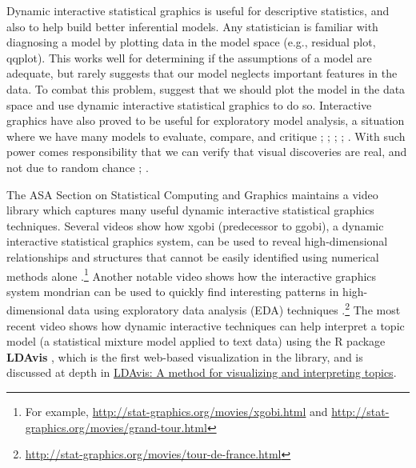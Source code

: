 \documentclass[11pt]{isuthesis}
\begin{document}
Dynamic interactive statistical graphics is useful for descriptive
statistics, and also to help build better inferential models. Any
statistician is familiar with diagnosing a model by plotting data in the
model space (e.g., residual plot, qqplot). This works well for
determining if the assumptions of a model are adequate, but rarely
suggests that our model neglects important features in the data. To
combat this problem, \citep{Wickham:2015ur} suggest that we should plot
the model in the data space and use dynamic interactive statistical
graphics to do so. Interactive graphics have also proved to be useful
for exploratory model analysis, a situation where we have many models to
evaluate, compare, and critique \citep{Unwin:2003uy};
\citep{Urbanek:2004}; \citep{Ripley:2004}; \citep{Unwin:2006};
\citep{Wickham:2007wq}. With such power comes responsibility that we can
verify that visual discoveries are real, and not due to random chance
\citep{Buja:2009hp}; \citep{Majumder:2013ie}.

The ASA Section on Statistical Computing and Graphics maintains a video
library which captures many useful dynamic interactive statistical
graphics techniques. Several videos show how xgobi (predecessor to
ggobi), a dynamic interactive statistical graphics system, can be used
to reveal high-dimensional relationships and structures that cannot be
easily identified using numerical methods alone \citep{xgobi}.\footnote{For
  example, \url{http://stat-graphics.org/movies/xgobi.html} and
  \url{http://stat-graphics.org/movies/grand-tour.html}} Another notable
video shows how the interactive graphics system mondrian can be used to
quickly find interesting patterns in high-dimensional data using
exploratory data analysis (EDA) techniques
\citep{mondrianbook}.\footnote{\url{http://stat-graphics.org/movies/tour-de-france.html}}
The most recent video shows how dynamic interactive techniques can help
interpret a topic model (a statistical mixture model applied to text
data) using the R package \textbf{LDAvis} \citep{Sievert:2014b}, which
is the first web-based visualization in the library, and is discussed at
depth in
\protect\hyperlink{ldavis-a-method-for-visualizing-and-interpreting-topics}{LDAvis:
A method for visualizing and interpreting topics}.
\end{document}
